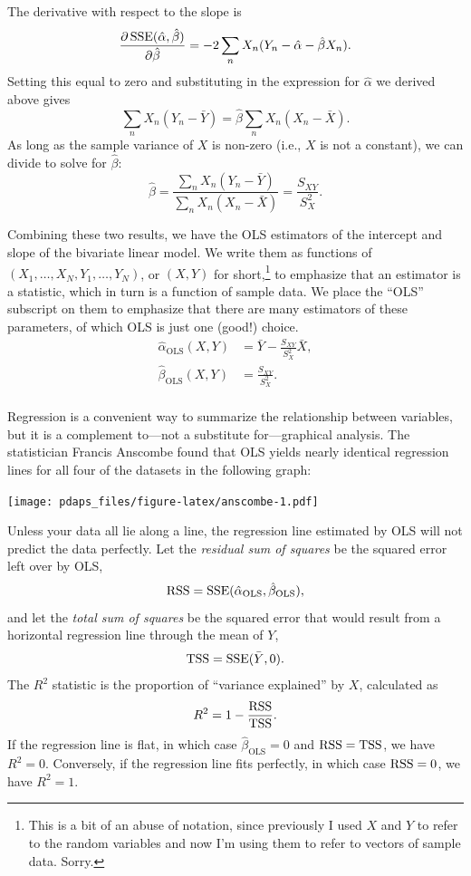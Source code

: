 \documentclass[12pt,oneside,openany]{book}
\begin{document}
The derivative with respect to the slope is \[
\frac{\partial{}\mathop{\rm SSE}\nolimits(\hat{\alpha}, \hat{\beta})}{\partial{}\hat{\beta}}
= -2 \sum_n X_n (Y_n - \hat{\alpha} - \hat{\beta} X_n).
\] Setting this equal to zero and substituting in the expression for
\(\hat{\alpha}\) we derived above gives \[
\sum_n X_n (Y_n - \bar{Y}) = \hat{\beta} \sum_n X_n (X_n - \bar{X}).
\] As long as the sample variance of \(X\) is non-zero (i.e., \(X\) is
not a constant), we can divide to solve for \(\hat{\beta}\): \[
\hat{\beta}
= \frac{\sum_n X_n (Y_n - \bar{Y})}{\sum_n X_n (X_n - \bar{X})}
= \frac{S_{XY}}{S_X^2}.
\]

Combining these two results, we have the OLS estimators of the intercept
and slope of the bivariate linear model. We write them as functions of
\((X_1, \ldots, X_N, Y_1, \ldots, Y_N)\), or \((X, Y)\) for
short,\footnote{This is a bit of an abuse of notation, since previously
  I used \(X\) and \(Y\) to refer to the random variables and now I'm
  using them to refer to vectors of sample data. Sorry.} to emphasize
that an estimator is a statistic, which in turn is a function of sample
data. We place the ``OLS'' subscript on them to emphasize that there are
many estimators of these parameters, of which OLS is just one (good!)
choice. \[
\begin{aligned}
\hat{\alpha}_{\text{OLS}}(X, Y)
&= \bar{Y} - \frac{S_{XY}}{S_X^2} \bar{X}, \\
\hat{\beta}_{\text{OLS}}(X, Y)
&= \frac{S_{XY}}{S_X^2}. \\
\end{aligned}
\]

Regression is a convenient way to summarize the relationship between
variables, but it is a complement to---not a substitute for---graphical
analysis. The statistician Francis Anscombe found that OLS yields nearly
identical regression lines for all four of the datasets in the following
graph:

\texttt{[image: pdaps\_files/figure-latex/anscombe-1.pdf]}

Unless your data all lie along a line, the regression line estimated by
OLS will not predict the data perfectly. Let the \emph{residual sum of
squares} be the squared error left over by OLS, \[
\mathop{\rm RSS}\nolimits = \mathop{\rm SSE}\nolimits(\hat{\alpha}_{\text{OLS}}, \hat{\beta}_{\text{OLS}}),
\] and let the \emph{total sum of squares} be the squared error that
would result from a horizontal regression line through the mean of
\(Y\), \[
\mathop{\rm TSS}\nolimits = \mathop{\rm SSE}\nolimits(\bar{Y}, 0).
\] The \(R^2\) statistic is the proportion of ``variance explained'' by
\(X\), calculated as \[
R^2 = 1 - \frac{\mathop{\rm RSS}\nolimits}{\mathop{\rm TSS}\nolimits}.
\] If the regression line is flat, in which case
\(\hat{\beta}_{\text{OLS}} = 0\) and \(\mathop{\rm RSS}\nolimits = \mathop{\rm TSS}\nolimits\), we have
\(R^2= 0\). Conversely, if the regression line fits perfectly, in which
case \(\mathop{\rm RSS}\nolimits = 0\), we have \(R^2 = 1\).
\end{document}
